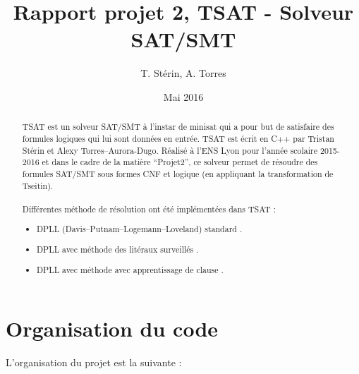 \documentclass{article}
\title{Rapport projet 2, TSAT - Solveur SAT/SMT}
\author{T. Stérin, A. Torres}
\date{Mai 2016}
\newcommand{\litt}{\alpha}
\newcommand{\non}[1]{\overline{#1}}
\begin{document}
\maketitle

\begin{abstract}
TSAT est un solveur SAT/SMT à l'instar de minisat \cite{minisat} qui a pour but de satisfaire des formules logiques qui lui sont données en entrée.
TSAT est écrit en C++ par Tristan Stérin et Alexy Torres--Aurora-Dugo.
Réalisé à l'ENS Lyon pour l'année scolaire 2015-2016 et dans le cadre de la matière ``Projet2'', ce solveur permet de résoudre des formules SAT/SMT sous formes CNF et logique (en appliquant la transformation de Tseitin).
\\ \\
Différentes méthode de résolution ont été implémentées dans TSAT : 
\begin{itemize}
	\item DPLL (Davis–Putnam–Logemann–Loveland) standard \cite{DPLL}.
	\item DPLL avec méthode des litéraux surveillés \cite{WL}.
	\item DPLL avec méthode avec apprentissage de clause \cite{CL}.
\end{itemize}
\end{abstract}

\section{Organisation du code}
L'organisation du projet est la suivante :

\newpage
\end{document}
